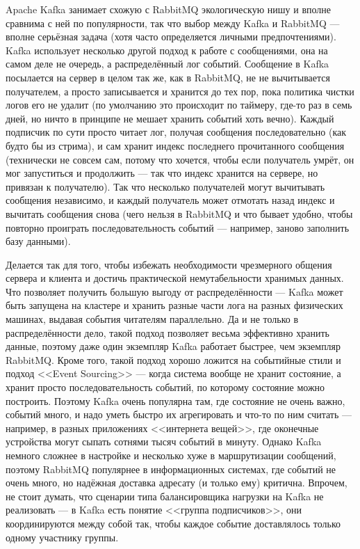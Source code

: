 \documentclass[a5paper]{article}
\begin{document}
Apache Kafka занимает схожую с RabbitMQ экологическую нишу и вполне сравнима с ней по популярности, так что выбор между Kafka и RabbitMQ --- вполне серьёзная задача (хотя часто определяется личными предпочтениями). Kafka использует несколько другой подход к работе с сообщениями, она на самом деле не очередь, а распределённый лог событий. Сообщение в Kafka посылается на сервер в целом так же, как в RabbitMQ, не не вычитывается получателем, а просто записывается и хранится до тех пор, пока политика чистки логов его не удалит (по умолчанию это происходит по таймеру, где-то раз в семь дней, но ничто в принципе не мешает хранить событий хоть вечно). Каждый подписчик по сути просто читает лог, получая сообщения последовательно (как будто бы из стрима), и сам хранит индекс последнего прочитанного сообщения (технически не совсем сам, потому что хочется, чтобы если получатель умрёт, он мог запуститься и продолжить --- так что индекс хранится на сервере, но привязан к получателю). Так что несколько получателей могут вычитывать сообщения независимо, и каждый получатель может отмотать назад индекс и вычитать сообщения снова (чего нельзя в RabbitMQ и что бывает удобно, чтобы повторно проиграть последовательность событий --- например, заново заполнить базу данными).

Делается так для того, чтобы избежать необходимости чрезмерного общения сервера и клиента и достичь практической немутабельности хранимых данных. Что позволяет получить большую выгоду от распределённости --- Kafka может быть запущена на кластере и хранить разные части лога на разных физических машинах, выдавая события читателям параллельно. Да и не только в распределённости дело, такой подход позволяет весьма эффективно хранить данные, поэтому даже один экземпляр Kafka работает быстрее, чем экземпляр RabbitMQ. Кроме того, такой подход хорошо ложится на событийные стили и подход <<Event Sourcing>> --- когда система вообще не хранит состояние, а хранит просто последовательность событий, по которому состояние можно построить. Поэтому Kafka очень популярна там, где состояние не очень важно, событий много, и надо уметь быстро их агрегировать и что-то по ним считать --- например, в разных приложениях <<интернета вещей>>, где оконечные устройства могут сыпать сотнями тысяч событий в минуту. Однако Kafka немного сложнее в настройке и несколько хуже в маршрутизации сообщений, поэтому RabbitMQ популярнее в информационных системах, где событий не очень много, но надёжная доставка адресату (и только ему) критична. Впрочем, не стоит думать, что сценарии типа балансировщика нагрузки на Kafka не реализовать --- в Kafka есть понятие <<группа подписчиков>>, они координируются между собой так, чтобы каждое событие доставлялось только одному участнику группы.
\end{document}
